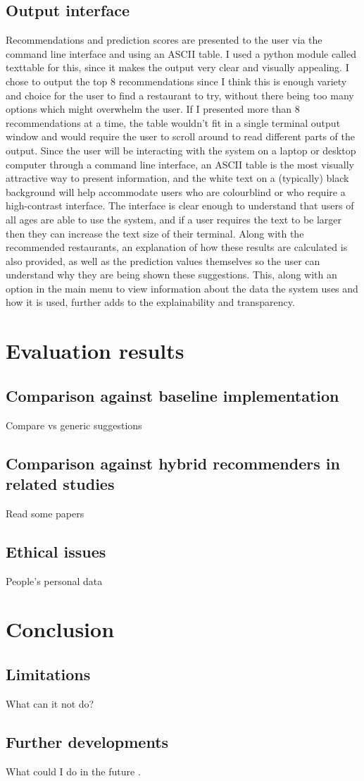 \documentclass[conference]{IEEEtran}
\begin{document}
\subsection{Output interface}
Recommendations and prediction scores are presented to the user via the command line interface and using an ASCII table. 
I used a python module called texttable for this, since it makes the output very clear and visually appealing. 
I chose to output the top 8 recommendations since I think this is enough variety and choice for the user to find 
a restaurant to try, without there being too many options which might overwhelm the user. 
If I presented more than 8 recommendations at a time, the table wouldn't fit in a single terminal output window and 
would require the user to scroll around to read different parts of the output. 
Since the user will be interacting with the system on a laptop or desktop computer through a command line interface, 
an ASCII table is the most visually attractive way to present information, and the white text on a (typically) black 
background will help accommodate users who are colourblind or who require a high-contrast interface. 
The interface is clear enough to understand that users of all ages are able to use the system, and if a user 
requires the text to be larger then they can increase the text size of their terminal. 
Along with the recommended restaurants, an explanation of how these results are calculated is also provided, as 
well as the prediction values themselves so the user can understand why they are being shown these suggestions. 
This, along with an option in the main menu to view information about the data the system uses and how it is used, 
further adds to the explainability and transparency. 


\section{Evaluation results}

\subsection{Comparison against baseline implementation}
Compare vs generic suggestions

\subsection{Comparison against hybrid recommenders in related studies}
Read some papers

\subsection{Ethical issues}
People's personal data


\section{Conclusion}

\subsection{Limitations}
What can it not do?

\subsection{Further developments}
What could I do in the future \cite{5284958}. 




\end{document}

